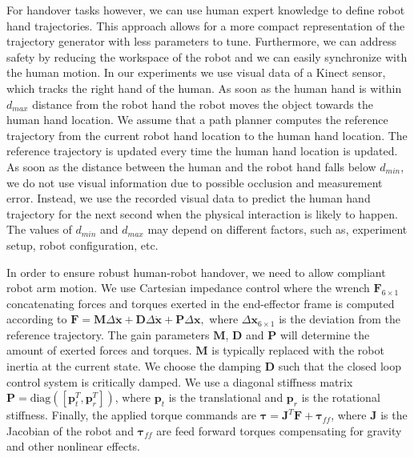 For handover tasks however, we can use human expert knowledge to define robot hand trajectories. This approach allows for a more compact representation of the trajectory generator with less parameters to tune. Furthermore, we can address safety by reducing the workspace of the robot and we can easily synchronize with the human motion. In our experiments we use visual data of a Kinect sensor, which tracks the right hand of the human. As soon as the human hand is within $d_{max}$ distance from the robot hand the robot moves the object towards the human hand location. We assume that a path planner computes the reference trajectory from the current robot hand location to the human hand location. The reference trajectory is updated every time the human hand location is updated. As soon as the distance between the human and the robot hand falls below $d_{min}$, we do not use visual information due to possible occlusion and measurement error. Instead, we use the recorded visual data to predict the human hand trajectory for the next second when the physical interaction is likely to happen.  The values of $d_{min}$ and $d_{max}$ may depend on different factors, such as, experiment setup, robot configuration, etc.

In order to ensure robust human-robot handover, we need to allow compliant robot arm motion. We use Cartesian impedance control \citep{BruKha08} where the wrench $\boldsymbol{F}_{6 \times 1}$ concatenating forces and torques exerted in the end-effector frame is computed according to $
\boldsymbol{F} = \boldsymbol{M} \Delta \boldsymbol{\ddot{  {\boldsymbol{x}} }} + \boldsymbol{D} \Delta\boldsymbol{\dot{  {\boldsymbol{x}} }} + \boldsymbol{P}
\Delta  {\boldsymbol{x}} , $ where $\Delta  {\boldsymbol{x}} _{6\times 1}$ is the deviation from the reference trajectory. The gain parameters $\boldsymbol{M}$, $\boldsymbol{D}$ and
$\boldsymbol{P}$ will determine the amount of exerted forces and torques. 
$\boldsymbol{M}$ is typically replaced with the robot inertia at the current state. We choose the damping $\boldsymbol{D}$ such that the closed loop control system is critically damped. We use a diagonal stiffness matrix
$\boldsymbol{P} = \mbox{diag}([\boldsymbol{p}_t^T, \boldsymbol{p}_r^T])$, where $\boldsymbol{p}_t$
is the translational and $\boldsymbol{p}_r$ is the rotational stiffness. Finally, the applied torque commands are $\boldsymbol{\tau} = \boldsymbol{J}^T \boldsymbol{F} + \boldsymbol{\tau}_{ff}$,
where $\boldsymbol{J}$ is the Jacobian of the robot and $\boldsymbol{\tau}_{ff}$ are feed forward torques compensating for gravity and other nonlinear effects.

